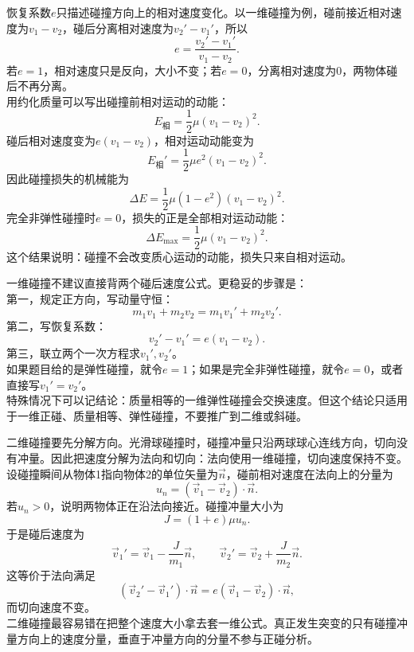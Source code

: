 \begin{casetypebox}[title={\strut\textcolor{white}{\bfseries 常见题型：恢复系数与约化质量}}]
恢复系数$e$只描述碰撞方向上的相对速度变化。以一维碰撞为例，碰前接近相对速度为$v_1-v_2$，碰后分离相对速度为$v_2'-v_1'$，所以
\[
  e=\frac{v_2'-v_1'}{v_1-v_2}.
\]
若$e=1$，相对速度只是反向，大小不变；若$e=0$，分离相对速度为0，两物体碰后不再分离。\\
用约化质量可以写出碰撞前相对运动的动能：
\[
  E_{\text{相}}=\frac12\mu(v_1-v_2)^2.
\]
碰后相对速度变为$e(v_1-v_2)$，相对运动动能变为
\[
  E_{\text{相}}'=\frac12\mu e^2(v_1-v_2)^2.
\]
因此碰撞损失的机械能为
\[
  \Delta E=\frac12\mu(1-e^2)(v_1-v_2)^2.
\]
完全非弹性碰撞时$e=0$，损失的正是全部相对运动动能：
\[
  \Delta E_{\max}=\frac12\mu(v_1-v_2)^2.
\]
这个结果说明：碰撞不会改变质心运动的动能，损失只来自相对运动。
\end{casetypebox}

\begin{casetypebox}[title={\strut\textcolor{white}{\bfseries 常见题型：一维碰撞的相对速度法}}]
一维碰撞不建议直接背两个碰后速度公式。更稳妥的步骤是：\\
第一，规定正方向，写动量守恒：
\[
  m_1v_1+m_2v_2=m_1v_1'+m_2v_2'.
\]
第二，写恢复系数：
\[
  v_2'-v_1'=e(v_1-v_2).
\]
第三，联立两个一次方程求$v_1',v_2'$。\\
如果题目给的是弹性碰撞，就令$e=1$；如果是完全非弹性碰撞，就令$e=0$，或者直接写$v_1'=v_2'$。\\
特殊情况下可以记结论：质量相等的一维弹性碰撞会交换速度。但这个结论只适用于一维正碰、质量相等、弹性碰撞，不要推广到二维或斜碰。
\end{casetypebox}

\begin{casetypebox}[title={\strut\textcolor{white}{\bfseries 常见题型：二维碰撞}}]
二维碰撞要先分解方向。光滑球碰撞时，碰撞冲量只沿两球球心连线方向，切向没有冲量。因此把速度分解为法向和切向：法向使用一维碰撞，切向速度保持不变。\\
设碰撞瞬间从物体1指向物体2的单位矢量为$\vec n$，碰前相对速度在法向上的分量为
\[
  u_n=(\vec v_1-\vec v_2)\cdot\vec n.
\]
若$u_n>0$，说明两物体正在沿法向接近。碰撞冲量大小为
\[
  J=(1+e)\mu u_n.
\]
于是碰后速度为
\[
  \vec v_1'=\vec v_1-\frac{J}{m_1}\vec n,\qquad
  \vec v_2'=\vec v_2+\frac{J}{m_2}\vec n.
\]
这等价于法向满足
\[
  (\vec v_2'-\vec v_1')\cdot\vec n
  =e(\vec v_1-\vec v_2)\cdot\vec n,
\]
而切向速度不变。\\
二维碰撞最容易错在把整个速度大小拿去套一维公式。真正发生突变的只有碰撞冲量方向上的速度分量，垂直于冲量方向的分量不参与正碰分析。
\end{casetypebox}

